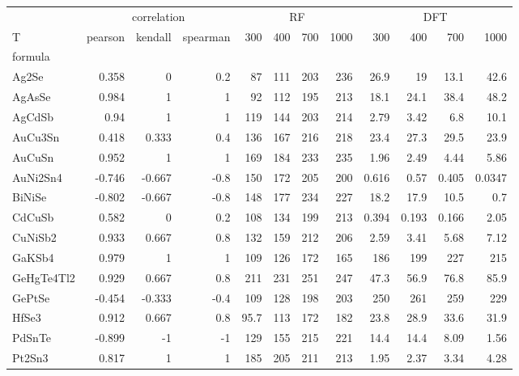 \begin{tabular}{lrrrrrrrrrrr}
\toprule
{} & \multicolumn{3}{c}{correlation} & \multicolumn{4}{c}{RF} & \multicolumn{4}{c}{DFT} \\
T &     pearson & kendall & spearman &  300 & 400 & 700 & 1000 &   300 &   400 &   700 &   1000 \\
formula    &             &         &          &      &     &     &      &       &       &       &        \\
\midrule
Ag2Se      &       0.358 &       0 &      0.2 &   87 & 111 & 203 &  236 &  26.9 &    19 &  13.1 &   42.6 \\
AgAsSe     &       0.984 &       1 &        1 &   92 & 112 & 195 &  213 &  18.1 &  24.1 &  38.4 &   48.2 \\
AgCdSb     &        0.94 &       1 &        1 &  119 & 144 & 203 &  214 &  2.79 &  3.42 &   6.8 &   10.1 \\
AuCu3Sn    &       0.418 &   0.333 &      0.4 &  136 & 167 & 216 &  218 &  23.4 &  27.3 &  29.5 &   23.9 \\
AuCuSn     &       0.952 &       1 &        1 &  169 & 184 & 233 &  235 &  1.96 &  2.49 &  4.44 &   5.86 \\
AuNi2Sn4   &      -0.746 &  -0.667 &     -0.8 &  150 & 172 & 205 &  200 & 0.616 &  0.57 & 0.405 & 0.0347 \\
BiNiSe     &      -0.802 &  -0.667 &     -0.8 &  148 & 177 & 234 &  227 &  18.2 &  17.9 &  10.5 &    0.7 \\
CdCuSb     &       0.582 &       0 &      0.2 &  108 & 134 & 199 &  213 & 0.394 & 0.193 & 0.166 &   2.05 \\
CuNiSb2    &       0.933 &   0.667 &      0.8 &  132 & 159 & 212 &  206 &  2.59 &  3.41 &  5.68 &   7.12 \\
GaKSb4     &       0.979 &       1 &        1 &  109 & 126 & 172 &  165 &   186 &   199 &   227 &    215 \\
GeHgTe4Tl2 &       0.929 &   0.667 &      0.8 &  211 & 231 & 251 &  247 &  47.3 &  56.9 &  76.8 &   85.9 \\
GePtSe     &      -0.454 &  -0.333 &     -0.4 &  109 & 128 & 198 &  203 &   250 &   261 &   259 &    229 \\
HfSe3      &       0.912 &   0.667 &      0.8 & 95.7 & 113 & 172 &  182 &  23.8 &  28.9 &  33.6 &   31.9 \\
PdSnTe     &      -0.899 &      -1 &       -1 &  129 & 155 & 215 &  221 &  14.4 &  14.4 &  8.09 &   1.56 \\
Pt2Sn3     &       0.817 &       1 &        1 &  185 & 205 & 211 &  213 &  1.95 &  2.37 &  3.34 &   4.28 \\

\end{tabular}
